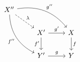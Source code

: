 \begin{definition*}
\begin{enumerate}
\begin{enumerate}[label=(PB\arabic*)]
          \[
            \begin{tikzcd}
                X''
                \arrow[bend left]{drr}[above right]{g''}
                \arrow[dashed]{dr}[above right]{\lambda}
                \arrow[bend right]{ddr}[below left]{f''}
              & {}
              & {}
              \\
                {}
              & X'
                \arrow{r}[above]{g'}
                \arrow{d}[left]{f'}
              & X
                \arrow{d}[right]{f}
              \\
                {}
              & Y'
                \arrow{r}[above]{g}
              & Y
            \end{tikzcd}
          \]
      \end{enumerate}
      

\end{enumerate}
\end{definition*}
